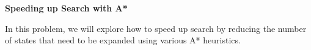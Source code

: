 \item {\bf Speeding up Search with A*}

In this problem, we will explore how to speed up search by reducing the number of states that need to be expanded using various A* heuristics.

\begin{enumerate}

  

  

  

\end{enumerate}
